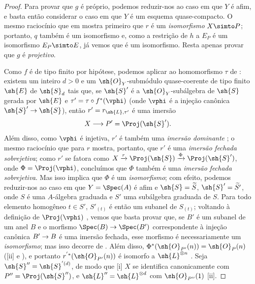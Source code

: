\documentclass[oneside,10pt]{amsart}
\makeatletter
\newcommand{\ega@arrow}[2]{\mathchoice{#1}{#2}{#2}{#2}}
\renewcommand{\to}{\ega@arrow{\longrightarrow}{\rightarrow}}
\newcommand{\oldpage}[2][]{\marginnote{\normalfont\footnotesize\textbf{#1}~|~#2}\ignorespaces}
\makeatother
\begin{document}
\begin{proof}
Para provar que $g$ é próprio, podemos reduzir-nos ao caso em que $Y$ é afim, e basta então considerar o caso em que $Y$ é um esquema quase-compacto.
O mesmo raciocínio que em  mostra primeiro que $r$ é um \emph{isomorfismo} $X\simto P$;
portanto, $q$ também é um isomorfismo e, como a restrição de $h$ a $E_P$ é um isomorfismo $E_P\simto E$, já vemos que  é um isomorfismo.
Resta apenas provar que $g$ é \emph{projetivo}.

Como $f$ é de tipo finito por hipótese, podemos aplicar  ao homomorfismo
\oldpage[II]{180}
$\tau$ de :
existem um inteiro $d>0$ e um $\sh{O}_Y$-submódulo quase-coerente de tipo finito $\sh{E}$ de $\sh{S}_d$ tais que, se $\sh{S}'$ é a $\sh{O}_Y$-subálgebra de $\sh{S}$ gerada por $\sh{E}$ e $\tau'=\tau\circ f^*(\vphi)$ (onde $\vphi$ é a injeção canônica $\sh{S}'\to\sh{S}$), então $r'=r_{\sh{L},\tau'}$ é uma imersão
\[
  X\to P'=\Proj(\sh{S}').
\]
Além disso, como $\vphi$ é injetiva, $r'$ é também uma \emph{imersão dominante} ;
o mesmo raciocínio que para $r$ mostra, portanto, que $r'$ é uma \emph{imersão fechada sobrejetiva};
como $r'$ se fatora como $X\xrightarrow{r}\Proj(\sh{S})\xrightarrow{\Phi}\Proj(\sh{S}')$, onde $\Phi=\Proj(\vphi)$, concluímos que $\Phi$ também é uma \emph{imersão fechada sobrejetiva}.
Mas isso implica que $\Phi$ é um \emph{isomorfismo};
com efeito, podemos reduzir-nos ao caso em que $Y=\Spec(A)$ é afim e $\sh{S}=\widetilde{S}$, $\sh{S}'=\widetilde{S'}$, onde $S$ é uma $A$-álgebra graduada e $S'$ uma subálgebra graduada de $S$.
Para todo elemento homogêneo $t\in S'$, $S'_{(t)}$ é então um subanel de $S_{(t)}$;
voltando à definição de $\Proj(\vphi)$ , vemos que basta provar que, se $B'$ é um subanel de um anel $B$ e o morfismo $\Spec(B)\to\Spec(B')$ correspondente à injeção canônica $B'\to B$ é uma imersão fechada, esse morfismo é necessariamente um \emph{isomorfismo};
mas isso decorre de .
Além disso, $\Phi^*(\sh{O}_{P'}(n))=\sh{O}_P(n)$ ([ii] e ), e portanto $r^{'*}(\sh{O}_{P'}(n))$ é isomorfo a $\sh{L}^{\otimes n}$ .
Seja $\sh{S}''=\sh{S}^{'(d)}$, de modo que [i] $X$ se identifica canonicamente com $P''=\Proj(\sh{S}'')$, e $\sh{L}''=\sh{L}^{\otimes d}$ com $\sh{O}_{P''}(1)$ [ii].


\end{proof}
\end{document}
